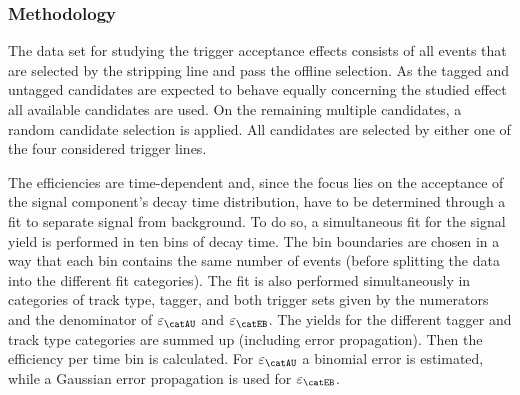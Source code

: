 \subsubsection{Methodology}
\label{sec:measurement_of_sin2beta:resolution_and_acceptance:acceptance:lower:methodology}

The data set for studying the trigger acceptance effects consists of all events
that are selected by the \StrippingDetached stripping line and pass the
offline selection. As the tagged and untagged candidates are expected to behave
equally concerning the studied effect all available candidates are used.
On the remaining multiple candidates, a random candidate selection is applied.
All candidates are selected by either one of the four considered trigger lines.

The efficiencies are time-dependent and, since the focus lies on the acceptance
of the signal component's decay time distribution, have to be determined through
a fit to separate signal from background. To do so, a simultaneous fit for the
signal yield is performed in ten bins of decay time. The bin boundaries are
chosen in a way that each bin contains the same number of events (before
splitting the data into the different fit categories). The fit is also performed
simultaneously in categories of track type, tagger, and both trigger sets given
by the numerators and the denominator of $\varepsilon_\text{\catAU}$ and
$\varepsilon_\text{\catEB}$. The yields for the different tagger and track type
categories are summed up (including error propagation). Then the efficiency per
time bin is calculated. For $\varepsilon_{\catAU}$ a binomial error is
estimated, while a Gaussian error propagation is used for
$\varepsilon_{\catEB}$.

